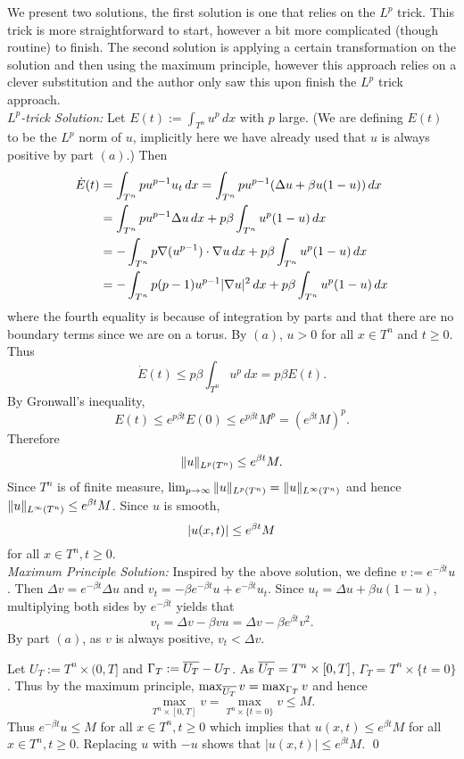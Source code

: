 We present two solutions,
the first solution is one that relies on the $L^{p}$ trick. This trick is more straightforward to start, however a bit more complicated (though routine) to finish.
The second solution is applying a certain transformation on the solution and then using the maximum principle, however this approach relies
on a clever substitution and the author only saw this upon finish the $L^{p}$ trick approach.\\

\noindent \textit{$L^{p}$-trick Solution:} Let $E(t) := \int_{T^{n}}u^{p}\, dx$ with $p$ large. (We are defining $E(t)$
to be the $L^{p}$ norm of $u$, implicitly here we have already used that $u$ is always positive by part $(a)$.) Then
\begin{align*}
\dot{E}(t) &= \int_{T^{n}}pu^{p - 1}u_{t}\, dx = \int_{T^{n}}pu^{p - 1}(\Delta u + \beta u(1 -u))\, dx\\
&= \int_{T^{n}}pu^{p - 1}\Delta u\, dx + p\beta \int_{T^{n}}u^{p}(1 - u)\, dx\\
&= -\int_{T^{n}}p\nabla(u^{p - 1}) \cdot \nabla u\, dx + p\beta\int_{T^{n}}u^{p}(1 - u)\, dx\\
&= -\int_{T^{n}}p(p - 1)u^{p - 1}|\nabla u|^{2}\, dx + p\beta \int_{T^{n}}u^{p}(1 - u)\, dx
\end{align*}
where the fourth equality is because of integration by parts and that there are no boundary terms since we are
on a torus. By $(a)$, $u > 0$ for all $x \in T^{n}$ and $t \geq 0$. Thus
$$\dot{E}(t) \leq p\beta \int_{T^{n}}u^{p}\, dx = p\beta E(t).$$
By Gronwall's inequality,
$$E(t) \leq e^{p\beta t}E(0) \leq e^{p\beta t}M^{p} = (e^{\beta t}M)^{p}.$$
Therefore
$$\| u \|_{L^{p}(T^{n})} \leq e^{\beta t}M.$$
Since $T^{n}$ is of finite measure, $\lim_{p \rightarrow \infty}\| u \|_{L^{p}(T^{n})} = \| u \|_{L^{\infty}(T^{n})}$ and hence
$\| u \|_{L^{\infty}(T^{n})} \leq e^{\beta t}M$. Since $u$ is smooth,
$$|u(x, t)| \leq e^{\beta t}M$$ for all $x \in T^{n}, t \geq 0$.\\

\noindent \textit{Maximum Principle Solution:} Inspired by the above solution, we define $v := e^{-\beta t}u$.
Then $\Delta v = e^{-\beta t}\Delta u$ and $v_{t} = -\beta e^{-\beta t}u + e^{-\beta t}u_{t}$.
Since $u_{t} = \Delta u + \beta u(1 - u)$, multiplying both sides by $e^{-\beta t}$ yields that
$$v_{t} = \Delta v - \beta vu = \Delta v - \beta e^{\beta t}v^{2}.$$
By part $(a)$, as $v$ is always positive, $v_{t} < \Delta v$.

Let $U_{T} := T^{n} \times (0, T]$ and $\Gamma_{T} := \overline{U_{T}} - U_{T}$. As $\overline{U_{T}} = T^{n} \times [0, T]$,
$\Gamma_{T} = T^{n} \times \{t = 0\}$. Thus by the maximum principle,
$\max_{\overline{U_{T}}}v = \max_{\Gamma_{T}}v$ and hence
$$\max_{T^{n} \times [0, T]}v = \max_{T^{n} \times \{t = 0\}}v \leq M.$$
Thus $e^{-\beta t}u \leq M$ for all $x \in T^{n}, t \geq 0$ which implies that $u(x, t) \leq e^{\beta t}M$
for all $x \in T^{n}, t \geq 0$. Replacing $u$ with $-u$ shows
that $|u(x, t)| \leq e^{\beta t}M$.
\hfill\qed

